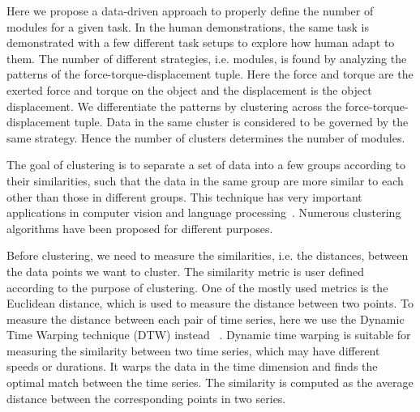 Here we propose a data-driven approach to properly define the number of modules for a given task. In the human
demonstrations, the same task is demonstrated with a few different task setups to explore how human adapt to them. The number of different strategies, i.e. modules, is found by analyzing the patterns of the force-torque-displacement tuple. Here the force and torque are the exerted force and torque on the object and the displacement is the object displacement.
We differentiate the patterns by clustering across
the force-torque-displacement tuple. Data in the same cluster is
considered to be governed by the same strategy. Hence the number of clusters
determines the number of modules.


The goal of clustering is to separate a set of data into a few groups according to their similarities, such that the data in the same group are more similar to each other than those in different groups. This technique has very important applications in computer vision and language processing~\cite{warren2005clustering}. Numerous clustering algorithms have been proposed for different purposes.

Before clustering, we need to measure the similarities, i.e. the distances, between the data points we want to cluster. The similarity metric is user defined according to the purpose of clustering. One of the mostly used metrics is the Euclidean distance, which is used to measure the distance between two points. To measure the distance between each pair of time series, here we use the Dynamic Time Warping technique (DTW) instead ~\citep{berndt1994using}.
Dynamic time warping is suitable for measuring the similarity between two time series, which may have different speeds or durations. It warps the data in the time dimension and finds the optimal match between the time series. The similarity is computed as the average distance between the corresponding points in two series.


